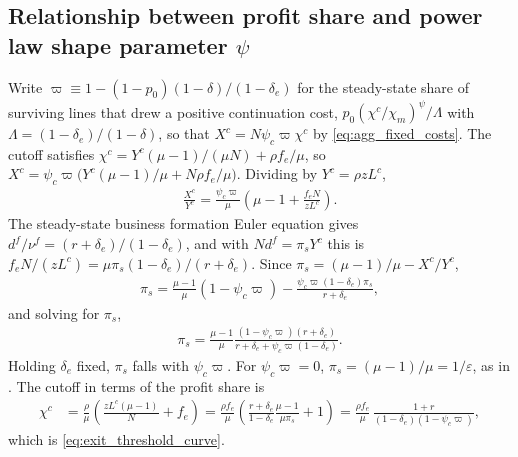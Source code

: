 \documentclass[authoryear, review, 12pt]{elsarticle}
\begin{document}
	\subsection{Relationship between profit share and power law shape parameter $\psi$}
Write $\varpi\equiv1-(1-p_0)(1-\delta)/(1-\delta_e)$ for the steady-state share of
surviving lines that drew a positive continuation cost, $p_0(\chi^c/\chi_m)^\psi/\Lambda$
with $\Lambda=(1-\delta_e)/(1-\delta)$, so that $X^c=N\psi_c\varpi\chi^c$ by
\eqref{eq:agg_fixed_costs}. The cutoff satisfies $\chi^c=Y^c(\mu-1)/(\mu N)+\rho f_e/\mu$,
so $X^c=\psi_c\varpi\bigl(Y^c(\mu-1)/\mu+N\rho f_e/\mu\bigr)$. Dividing by $Y^c=\rho zL^c$,
\begin{align*}
	\frac{X^c}{Y^c}=\frac{\psi_c\varpi}{\mu}\left(\mu-1+\frac{f_eN}{zL^c}\right).
\end{align*}
The steady-state business formation Euler equation gives $d^f/\nu^f=(r+\delta_e)/(1-\delta_e)$,
and with $Nd^f=\pi_sY^c$ this is $f_eN/(zL^c)=\mu\pi_s(1-\delta_e)/(r+\delta_e)$. Since
$\pi_s=(\mu-1)/\mu-X^c/Y^c$,
\begin{align*}
	\pi_s=\frac{\mu-1}{\mu}(1-\psi_c\varpi)-\frac{\psi_c\varpi(1-\delta_e)\pi_s}{r+\delta_e},
\end{align*}
and solving for $\pi_s$,
\begin{align}\label{eq:profit_share_ss}
	\pi_s=\frac{\mu-1}{\mu}\frac{(1-\psi_c\varpi)(r+\delta_e)}{r+\delta_e+\psi_c\varpi(1-\delta_e)}.
\end{align}
Holding $\delta_e$ fixed, $\pi_s$ falls with $\psi_c\varpi$. For $\psi_c\varpi=0$,
$\pi_s=(\mu-1)/\mu=1/\varepsilon$, as in \citet{bilbiie_2012}. The cutoff in terms of the
profit share is
\begin{align*}
	\chi^c&=\frac{\rho}{\mu}\left(\frac{zL^c(\mu-1)}{N}+f_e\right)
	=\frac{\rho f_e}{\mu}\left(\frac{r+\delta_e}{1-\delta_e}\frac{\mu-1}{\mu \pi_s}+1\right)
	=\frac{\rho f_e}{\mu}\,\frac{1+r}{(1-\delta_e)(1-\psi_c\varpi)},
\end{align*}
which is \eqref{eq:exit_threshold_curve}.
\end{document}
